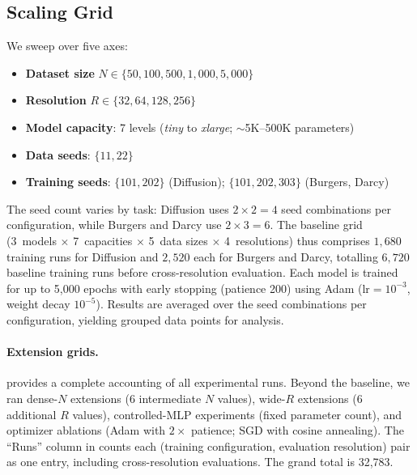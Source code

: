 \documentclass[11pt]{article}
\newcommand{\totalRuns}{32{,}783}
\begin{document}
\subsection{Scaling Grid}
We sweep over five axes:
\begin{itemize}
  \item \textbf{Dataset size} $N \in \{50, 100, 500, 1{,}000, 5{,}000\}$
  \item \textbf{Resolution} $R \in \{32, 64, 128, 256\}$
  \item \textbf{Model capacity}: 7 levels (\textit{tiny} to
    \textit{xlarge}; $\sim$5K--500K parameters)
  \item \textbf{Data seeds}: $\{11, 22\}$
  \item \textbf{Training seeds}: $\{101, 202\}$ (Diffusion);
    $\{101, 202, 303\}$ (Burgers, Darcy)
\end{itemize}
The seed count varies by task: Diffusion uses $2 \times 2 = 4$
seed combinations per configuration, while Burgers and Darcy use
$2 \times 3 = 6$. The baseline grid (3~models $\times$ 7~capacities
$\times$ 5~data sizes $\times$ 4~resolutions) thus comprises
$1{,}680$ training runs for Diffusion and $2{,}520$ each for Burgers
and Darcy, totalling $6{,}720$ baseline training runs before
cross-resolution evaluation.
Each model is trained
for up to 5{,}000 epochs with early stopping (patience 200) using Adam
($\text{lr} = 10^{-3}$, weight decay $10^{-5}$). Results are averaged
over the seed combinations per configuration, yielding grouped
data points for analysis.

\paragraph{Extension grids.}
 provides a complete accounting of all
experimental runs. Beyond the baseline, we ran
dense-$N$ extensions (6 intermediate $N$ values), wide-$R$
extensions (6 additional $R$ values), controlled-MLP experiments
(fixed parameter count), and optimizer ablations
(Adam with $2\times$ patience; SGD with cosine annealing).
The ``Runs'' column in  counts each
(training configuration, evaluation resolution) pair as one entry,
including cross-resolution evaluations.
The grand total is \totalRuns{}.
\end{document}
